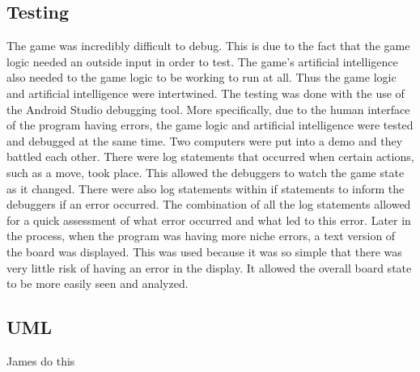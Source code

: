 \documentclass{article}
\begin{document}
\subsection{Testing}
	The game was incredibly difficult to debug. This is due to the fact that the game logic needed an outside input in order to test. The game's artificial intelligence also needed to the game logic to be working to run at all. Thus the game logic and artificial intelligence were intertwined. 
	The testing was done with the use of the Android Studio debugging tool. More specifically, due to the human interface of the program having errors, the game logic and artificial intelligence were tested and debugged at the same time. Two computers were put into a demo and they battled each other. There were log statements that occurred when certain actions, such as a move, took place. This allowed the debuggers to watch the game state as it changed. There were also log statements within if statements to inform the debuggers if an error occurred. The combination of all the log statements allowed for a quick assessment of what error occurred and what led to this error. 
	Later in the process, when the program was having more niche errors, a text version of the board was displayed. This was used because it was so simple that there was very little risk of having an error in the display. It allowed the overall board state to be more easily seen and analyzed.

\subsection{UML}
James do this
\end{document}
